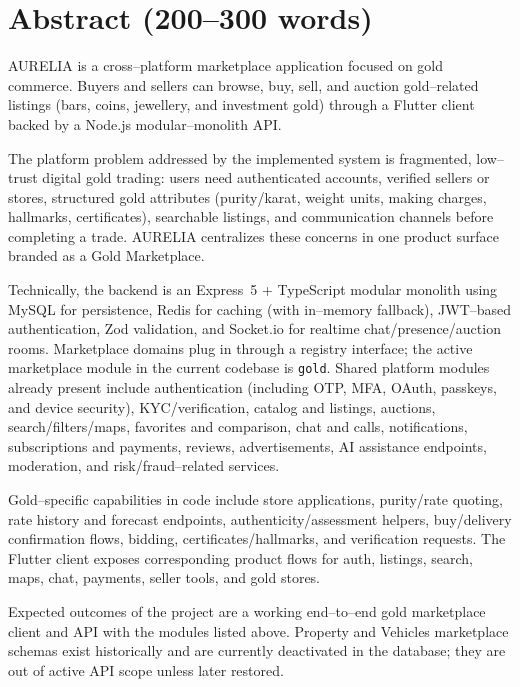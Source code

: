 \documentclass[11pt,a4paper]{article}
\begin{document}
\section{Abstract (200--300 words)}

AURELIA is a cross--platform marketplace application focused on gold commerce.
Buyers and sellers can browse, buy, sell, and auction gold--related listings
(bars, coins, jewellery, and investment gold) through a Flutter client backed by
a Node.js modular--monolith API.

The platform problem addressed by the implemented system is fragmented,
low--trust digital gold trading: users need authenticated accounts, verified
sellers or stores, structured gold attributes (purity/karat, weight units,
making charges, hallmarks, certificates), searchable listings, and communication
channels before completing a trade. AURELIA centralizes these concerns in one
product surface branded as a Gold Marketplace.

Technically, the backend is an Express~5 + TypeScript modular monolith using
MySQL for persistence, Redis for caching (with in--memory fallback), JWT--based
authentication, Zod validation, and Socket.io for realtime chat/presence/auction
rooms. Marketplace domains plug in through a registry interface; the active
marketplace module in the current codebase is \texttt{gold}. Shared platform
modules already present include authentication (including OTP, MFA, OAuth,
passkeys, and device security), KYC/verification, catalog and listings,
auctions, search/filters/maps, favorites and comparison, chat and calls,
notifications, subscriptions and payments, reviews, advertisements, AI
assistance endpoints, moderation, and risk/fraud--related services.

Gold--specific capabilities in code include store applications, purity/rate
quoting, rate history and forecast endpoints, authenticity/assessment helpers,
buy/delivery confirmation flows, bidding, certificates/hallmarks, and
verification requests. The Flutter client exposes corresponding product flows
for auth, listings, search, maps, chat, payments, seller tools, and gold stores.

Expected outcomes of the project are a working end--to--end gold marketplace
client and API with the modules listed above. Property and Vehicles marketplace
schemas exist historically and are currently deactivated in the database; they
are out of active API scope unless later restored.

\end{document}
